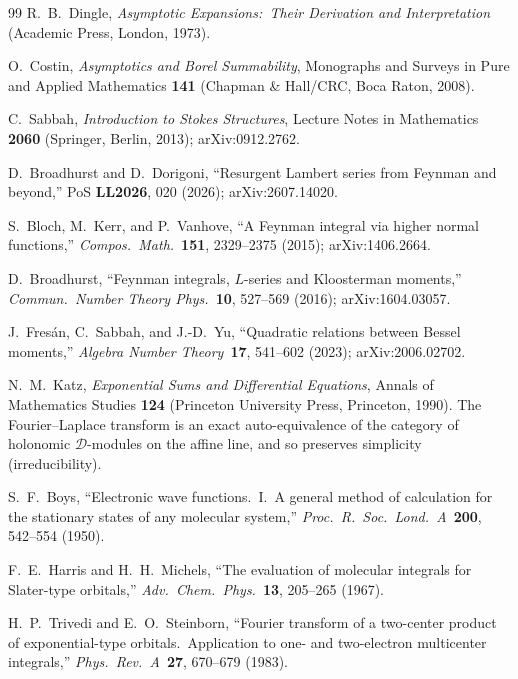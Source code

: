 \documentclass[aps,pra,twocolumn,superscriptaddress,longbibliography]{revtex4-2}
\begin{document}
\begin{thebibliography}{99}
R.~B.~Dingle, \textit{Asymptotic Expansions:\ Their Derivation and
Interpretation} (Academic Press, London, 1973).

O.~Costin, \textit{Asymptotics and Borel Summability}, Monographs and Surveys in
Pure and Applied Mathematics \textbf{141} (Chapman \& Hall/CRC, Boca Raton, 2008).

C.~Sabbah, \textit{Introduction to Stokes Structures}, Lecture Notes in
Mathematics \textbf{2060} (Springer, Berlin, 2013); arXiv:0912.2762.

D.~Broadhurst and D.~Dorigoni, ``Resurgent Lambert series from Feynman and
beyond,'' PoS \textbf{LL2026}, 020 (2026); arXiv:2607.14020.

S.~Bloch, M.~Kerr, and P.~Vanhove, ``A Feynman integral via higher normal
functions,'' \textit{Compos.\ Math.}\ \textbf{151}, 2329--2375 (2015);
arXiv:1406.2664.

D.~Broadhurst, ``Feynman integrals, $L$-series and Kloosterman moments,''
\textit{Commun.\ Number Theory Phys.}\ \textbf{10}, 527--569 (2016);
arXiv:1604.03057.

J.~Fres\'an, C.~Sabbah, and J.-D.~Yu, ``Quadratic relations between Bessel
moments,'' \textit{Algebra Number Theory}\ \textbf{17}, 541--602 (2023);
arXiv:2006.02702.

N.~M.~Katz, \textit{Exponential Sums and Differential Equations}, Annals of
Mathematics Studies \textbf{124} (Princeton University Press, Princeton, 1990).
The Fourier--Laplace transform is an exact auto-equivalence of the category of
holonomic $\mathcal{D}$-modules on the affine line, and so preserves simplicity
(irreducibility).

S.~F.~Boys, ``Electronic wave functions.\ I.\ A general method of calculation
for the stationary states of any molecular system,'' \textit{Proc.\ R.\ Soc.\
Lond.\ A}\ \textbf{200}, 542--554 (1950).

F.~E.~Harris and H.~H.~Michels, ``The evaluation of molecular integrals for
Slater-type orbitals,'' \textit{Adv.\ Chem.\ Phys.}\ \textbf{13}, 205--265 (1967).

H.~P.~Trivedi and E.~O.~Steinborn, ``Fourier transform of a two-center product
of exponential-type orbitals.\ Application to one- and two-electron multicenter
integrals,'' \textit{Phys.\ Rev.\ A}\ \textbf{27}, 670--679 (1983).


\end{thebibliography}
\end{document}
